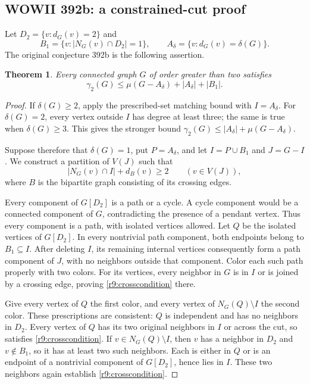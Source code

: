 \documentclass[11pt,a4paper]{article}
\newtheorem{theorem}{Theorem}[section]
\theoremstyle{remark}
\begin{document}
\subsection{WOWII 392b: a constrained-cut proof}
\label{r9:392b}
Let $D_2=\{v:d_G(v)=2\}$ and
\[
 B_1=\{v:|N_G(v)\cap D_2|=1\},
 \qquad A_\delta=\{v:d_G(v)=\delta(G)\}.
\]
The original conjecture 392b is the following assertion.
\begin{theorem}\label{r9:thm392b}
Every connected graph $G$ of order greater than two satisfies
\[
 \gamma_2(G)\le\mu(G-A_\delta)+|A_\delta|+|B_1|.
\]
\end{theorem}
\begin{proof}
If $\delta(G)\ge2$, apply the prescribed-set matching bound with
$I=A_\delta$. For $\delta(G)=2$, every vertex outside $I$ has degree at
least three; the same is true when $\delta(G)\ge3$. This gives the
stronger bound $\gamma_2(G)\le |A_\delta|+\mu(G-A_\delta)$.

Suppose therefore that $\delta(G)=1$, put $P=A_\delta$, and let
$I=P\cup B_1$ and $J=G-I$. We construct a partition of $V(J)$ such that
\begin{equation}\label{r9:crosscondition}
 |N_G(v)\cap I|+d_B(v)\ge2\qquad(v\in V(J)),
\end{equation}
where $B$ is the bipartite graph consisting of its crossing edges.

Every component of $G[D_2]$ is a path or a cycle. A cycle component would
be a connected component of $G$, contradicting the presence of a pendant
vertex. Thus every component is a path, with isolated vertices allowed.
Let $Q$ be the isolated vertices of $G[D_2]$. In every nontrivial path
component, both endpoints belong to $B_1\subseteq I$. After deleting $I$,
its remaining internal vertices consequently form a path component of
$J$, with no neighbors outside that component. Color each such path
properly with two colors. For its vertices, every neighbor in $G$ is
in $I$ or is joined by a crossing edge, proving
\eqref{r9:crosscondition} there.

Give every vertex of $Q$ the first color, and every vertex of
$N_G(Q)\setminus I$ the second color. These prescriptions are consistent:
$Q$ is independent and has no neighbors in $D_2$. Every vertex of $Q$
has its two original neighbors in $I$ or across the cut, so satisfies
\eqref{r9:crosscondition}. If $v\in N_G(Q)\setminus I$, then $v$ has a
neighbor in $D_2$ and $v\notin B_1$, so it has at least two such neighbors.
Each is either in $Q$ or is an endpoint of a nontrivial component of
$G[D_2]$, hence lies in $I$. These two neighbors again establish
\eqref{r9:crosscondition}.


\end{proof}
\end{document}
